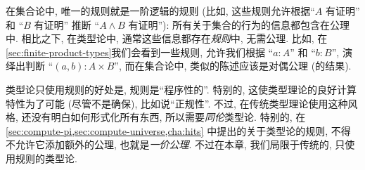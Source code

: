 在集合论中, 唯一的规则就是一阶逻辑的规则 (比如, 这些规则允许根据``$A$ 有证明'' 和 ``$B$ 有证明'' 推断 ``$A\wedge B$ 有证明''): 所有关于集合的行为的信息都包含在公理中. 相比之下, 在类型论中, 通常这些信息都存在\emph{规则}中, 无需公理. 比如, 在\cref{sec:finite-product-types}我们会看到一些规则, 允许我们根据 ``$a:A$'' 和 ``$b:B$'', 演绎出判断 ``$(a,b):A\times B$'', 而在集合论中, 类似的陈述应该是对偶公理 (的结果).

类型论只使用规则的好处是, 规则是``程序性的''. 特别的, 这使类型理论的良好计算特性为了可能 (尽管不是确保), 比如说``正规性''. 不过, 在传统类型理论使用这种风格, 还没有明白如何形式化所有东西, 所以需要\emph{同伦}类型论. 特别的, 在\cref{sec:compute-pi,sec:compute-universe,cha:hits} 中提出的关于类型论的规则, 不得不允许它添加额外的公理, 也就是\emph{一价公理}. 不过在本章, 我们局限于传统的, 只使用规则的类型论.